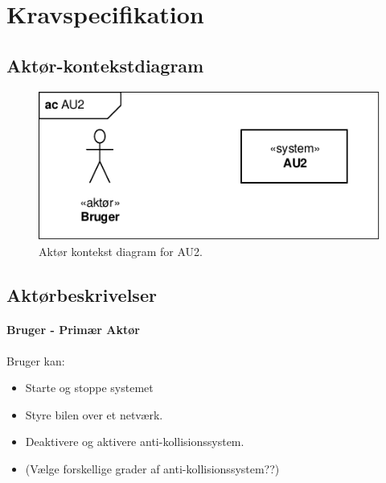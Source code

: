 \chapter{Kravspecifikation}
\section{Aktør-kontekstdiagram}

\begin{figure}[h]
\centering
\includegraphics[width=\textwidth - 3 cm]{../fig/diagrammer/ac_au2.pdf}
\caption{Aktør kontekst diagram for AU2.}
\label{fig:aktor_kontekst}
\end{figure}

\section{Aktørbeskrivelser}
\subsubsection{Bruger - Primær Aktør}
Bruger kan:
\begin{itemize}
\item Starte og stoppe systemet 
\item Styre bilen over et netværk.
\item Deaktivere og aktivere anti-kollisionssystem.
\item (Vælge forskellige grader af anti-kollisionssystem??)
\end{itemize}

